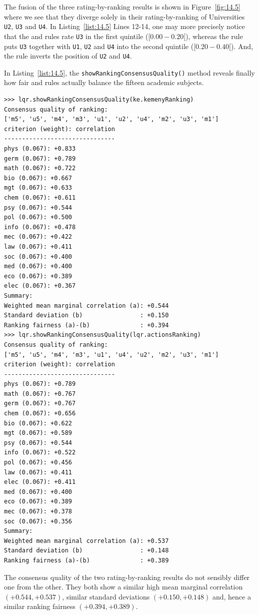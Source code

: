 The fusion of the three rating-by-ranking results is shown in Figure~\vref{fig:14.5} where we see that they diverge solely in their rating-by-ranking of Universities \texttt{U2}, \texttt{U3} and \texttt{U4}. In Listing~\vref{list:14.5} Lines 12-14, one may more precisely notice that the \Kemeny and \Copeland rules rate \texttt{U3} in the first quintile ($[0.00- 0.20[$), whereas the \NetFlows rule puts \texttt{U3} together with \texttt{U1}, \texttt{U2} and \texttt{U4} into the second quintile ($[0.20- 0.40[$). And, the \Kemeny rule inverts the position of \texttt{U2} and \texttt{U4}.

In Listing~\vref{list:14.5}, the \texttt{showRankingConsensusQuality()} method reveals finally how fair \Kemeny and \Copeland rules actually balance the fifteen academic subjects. 
\begin{lstlisting}[caption={Checking the consensus quality of \Kemeny and \Copeland rankings},label=list:14.5,basicstyle=\ttfamily\scriptsize]
>>> lqr.showRankingConsensusQuality(ke.kemenyRanking)
Consensus quality of ranking:
['m5', 'u5', 'm4', 'm3', 'u1', 'u2', 'u4', 'm2', 'u3', 'm1']
criterion (weight): correlation
-------------------------------
phys (0.067): +0.833
germ (0.067): +0.789
math (0.067): +0.722
bio (0.067): +0.667
mgt (0.067): +0.633
chem (0.067): +0.611
psy (0.067): +0.544
pol (0.067): +0.500
info (0.067): +0.478
mec (0.067): +0.422
law (0.067): +0.411
soc (0.067): +0.400
med (0.067): +0.400
eco (0.067): +0.389
elec (0.067): +0.367
Summary:
Weighted mean marginal correlation (a): +0.544
Standard deviation (b)                : +0.150
Ranking fairness (a)-(b)              : +0.394
>>> lqr.showRankingConsensusQuality(lqr.actionsRanking)
Consensus quality of ranking:
['m5', 'u5', 'm4', 'm3', 'u1', 'u4', 'u2', 'm2', 'u3', 'm1']
criterion (weight): correlation
-------------------------------
phys (0.067): +0.789
math (0.067): +0.767
germ (0.067): +0.767
chem (0.067): +0.656
bio (0.067): +0.622
mgt (0.067): +0.589
psy (0.067): +0.544
info (0.067): +0.522
pol (0.067): +0.456
law (0.067): +0.411
elec (0.067): +0.411
med (0.067): +0.400
eco (0.067): +0.389
mec (0.067): +0.378
soc (0.067): +0.356
Summary:
Weighted mean marginal correlation (a): +0.537
Standard deviation (b)                : +0.148
Ranking fairness (a)-(b)              : +0.389
\end{lstlisting}

The consensus quality of the two rating-by-ranking results do not sensibly differ one from the other. They both show a similar high mean marginal correlation $(+0.544, +0.537)$, similar standard deviations $(+0.150, +0.148)$ and, hence a similar ranking fairness $(+0.394, +0.389)$. 

